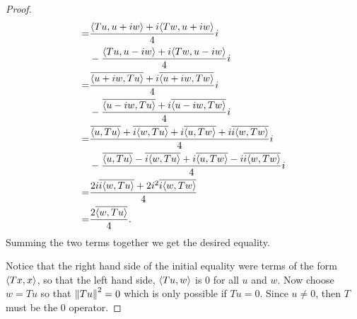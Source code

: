 \begin{proof}
\begin{align*}
    =& \frac{\langle Tu, u+iw\rangle + i\langle Tw, u+iw\rangle}{4}i\\
    &-\frac{\langle Tu, u-iw\rangle + i\langle Tw, u-iw\rangle}{4}i\\
    =& \frac{\overline{\langle u+iw,Tu\rangle} + i\overline{\langle u+iw,Tw\rangle}}{4}i\\
    &-\frac{\overline{\langle u-iw,Tu\rangle} + i\overline{\langle u-iw,Tw\rangle}}{4}i\\
    =& \frac{\overline{\langle u,Tu\rangle} +\overline{i\langle w,Tu\rangle}
    + i\overline{\langle u,Tw\rangle} +i\overline{i\langle w,Tw\rangle}}{4}i\\
    &-\frac{\overline{\langle u,Tu\rangle} - \overline{i\langle w,Tu\rangle} 
    + i\overline{\langle u,Tw\rangle} - i\overline{i\langle w,Tw\rangle}}{4}i\\
    =& \frac{2i\overline{i\langle w,Tu\rangle}
     +2i^2\overline{i\langle w,Tw\rangle}}{4}\\
    =& \frac{2\overline{\langle w,Tu\rangle}}{4}.
\end{align*}
Summing the two terms together we get the desired equality.

Notice that the right hand side of the initial equality were terms of the form $\langle Tx,x\rangle$, so that the left hand side, $\langle Tu,w\rangle$ is 0 for all $u$ and $w$.
Now choose $w=Tu$ so that $\left\lVert Tu\right\rVert^2=0$ which is only possible if $Tu=0$.
Since $u\neq 0$, then $T$ must be the 0 operator.
\end{proof}